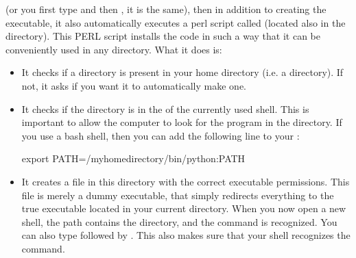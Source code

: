 \documentclass[letterpaper,10pt,english]{sphinxmanual}
\begin{document}
\begin{sphinxVerbatim}[commandchars=\\\{\}]
 
\end{sphinxVerbatim}

(or you first type  and then , it is the same), then in
addition to creating the executable, it also automatically executes a perl
script called  (located also in the  directory).  This
PERL script installs the code in such a way that it can be conveniently used in
any directory. What it does is:
\begin{itemize}
\item {} 
It checks if a  directory is present in your home
directory (i.e. a  directory). If not, it asks if
you want it to automatically make one.

\item {} 
It checks if the  directory is in the  of
the currently used shell. This is important to allow the computer to look
for the program  in the  directory. If you
use a bash shell, then you can add the following line to your
:

\begin{sphinxVerbatim}[commandchars=\\\{\}]
export PATH=/myhomedirectory/bin/python:\PYGZdl{}PATH
\end{sphinxVerbatim}

\item {} 
It creates a file  in this 
directory with the correct executable permissions. This file is merely a
dummy executable, that simply redirects everything to the true 
executable located in your current 
directory. When you now open a new shell, the path contains the
 directory, and the command  is
recognized. You can also type  followed
by . This also makes sure that your shell recognizes the
 command.


\end{itemize}
\end{document}
